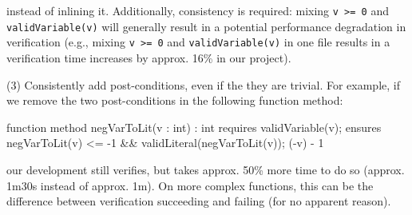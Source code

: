 \documentclass[12pt]{report}
\begin{document}
\noindent instead of inlining it. Additionally, consistency is
required: mixing \texttt{v >= 0} and \texttt{validVariable(v)} will
generally result in a potential performance degradation in
verification %
%
%
(e.g., mixing \texttt{v >= 0} and \texttt{validVariable(v)} in one
file results in a verification time increases by approx. 16\% in our project).




(3) Consistently add post-conditions, even if the they are
trivial. For example, if we remove the two post-conditions in the
following function method:

\begin{dafny}
function method negVarToLit(v : int) : int    requires validVariable(v);
  ensures negVarToLit(v) <= -1 && validLiteral(negVarToLit(v));
{ (-v) - 1 }
\end{dafny}

\noindent our development still verifies, but takes approx. 50\% more
time to do so (approx. 1m30s instead of approx. 1m). On more complex
functions, this can be the difference between verification succeeding
and failing (for no apparent reason).
\end{document}
